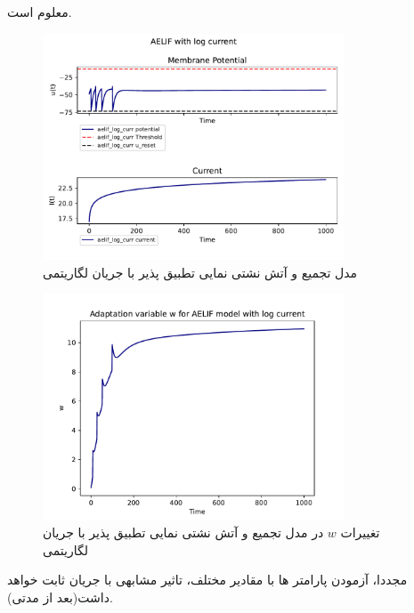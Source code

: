 \documentclass{article}
\begin{document}
                معلوم است.

                \begin{figure}[H]
                    \centering
                    \includegraphics[width=0.8\textwidth]{plots/AELIF with log current.pdf} 
                    \caption{مدل تجمیع و آتش نشتی نمایی تطبیق پذیر با جریان لگاریتمی}
                    \label{fig:aelif-log-curr}
                \end{figure}
                \begin{figure}[H]
                    \centering
                    \includegraphics[width=0.8\textwidth]{plots/Adaptation variable w for AELIF model with log current.pdf} 
                    \caption{تغییرات $w$ در مدل تجمیع و آتش نشتی نمایی تطبیق پذیر با جریان لگاریتمی}
                    \label{fig:aelif-w-log-curr}
                \end{figure}
                مجددا، آزمودن پارامتر ها با مقادیر مختلف، تاثیر مشابهی با جریان ثابت خواهد داشت(بعد از مدتی).


\newpage
\end{document}
